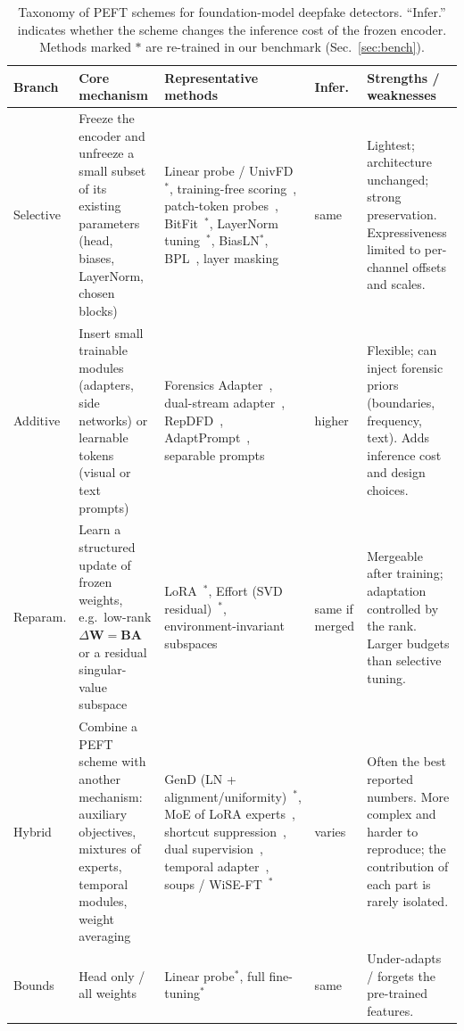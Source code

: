 \documentclass[fonts]{icst}
\begin{document}
\begin{table}[!t]
\centering
\caption{Taxonomy of PEFT schemes for foundation-model deepfake detectors. ``Infer.'' indicates whether the scheme changes the inference cost of the frozen encoder. Methods marked $\ast$ are re-trained in our benchmark (Sec.~\ref{sec:bench}).}
\label{tab:taxonomy}
\footnotesize
\begin{tabular}{p{} p{} p{} p{} p{}}
\toprule
\textbf{Branch} & \textbf{Core mechanism} & \textbf{Representative methods} & \textbf{Infer.} & \textbf{Strengths / weaknesses} \\
\midrule
Selective & Freeze the encoder and unfreeze a small subset of its existing parameters (head, biases, LayerNorm, chosen blocks) & Linear probe / UnivFD~\cite{ojha2023universal}$^\ast$, training-free scoring~\cite{tsai2024trainingfree}, patch-token probes~\cite{abdullah2026tap}, BitFit~\cite{benzaken2022bitfit}$^\ast$, LayerNorm tuning~\cite{yermakov2025clip}$^\ast$, BiasLN$^\ast$, BPL~\cite{xu2026bpl}, layer masking~\cite{zhang2026layermask} & same & Lightest; architecture unchanged; strong preservation. Expressiveness limited to per-channel offsets and scales. \\
Additive & Insert small trainable modules (adapters, side networks) or learnable tokens (visual or text prompts) & Forensics Adapter~\cite{cui2025forada}, dual-stream adapter~\cite{liao2026dfa}, RepDFD~\cite{lin2025repdfd}, AdaptPrompt~\cite{jiang2026adaptprompt}, separable prompts~\cite{yang2026separable} & higher & Flexible; can inject forensic priors (boundaries, frequency, text). Adds inference cost and design choices. \\
Reparam. & Learn a structured update of frozen weights, e.g.\ low-rank $\Delta\mathbf{W}=\mathbf{B}\mathbf{A}$ or a residual singular-value subspace & LoRA~\cite{hu2022lora}$^\ast$, Effort (SVD residual)~\cite{yan2025effort}$^\ast$, environment-invariant subspaces~\cite{chen2026envsubspace} & same if merged & Mergeable after training; adaptation controlled by the rank. Larger budgets than selective tuning. \\
Hybrid & Combine a PEFT scheme with another mechanism: auxiliary objectives, mixtures of experts, temporal modules, weight averaging & GenD (LN + alignment/uniformity)~\cite{yermakov2025gend}$^\ast$, MoE of LoRA experts~\cite{liu2024mole}, shortcut suppression~\cite{wang2026shortcut}, dual supervision~\cite{zhang2026dino}, temporal adapter~\cite{han2024fcg}, soups / WiSE-FT~\cite{wortsman2022soups,wortsman2022wiseft}$^\ast$ & varies & Often the best reported numbers. More complex and harder to reproduce; the contribution of each part is rarely isolated. \\
\midrule
Bounds & Head only / all weights & Linear probe$^\ast$, full fine-tuning$^\ast$ & same & Under-adapts / forgets the pre-trained features. \\
\bottomrule
\end{tabular}
\end{table}
\end{document}
